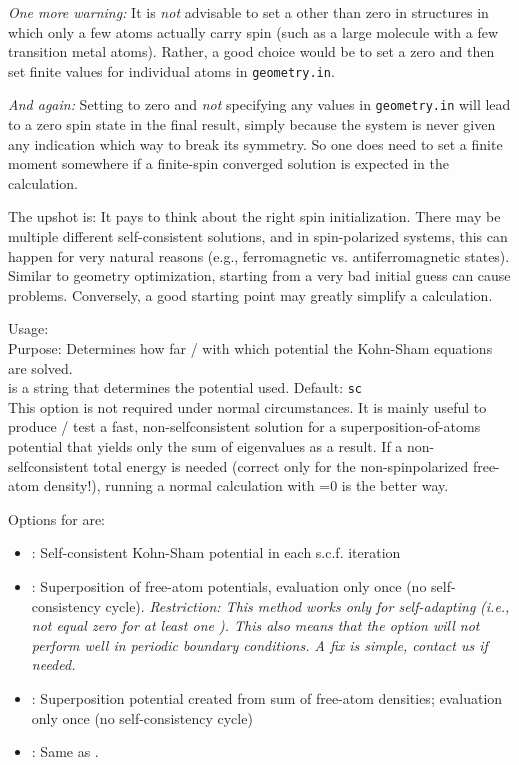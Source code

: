 \emph{One more warning:} It is \emph{not} advisable to set a
 other than zero in structures in
which only a few atoms actually carry spin (such as a large molecule
with a few transition metal atoms). Rather, a good choice would be to
set a zero  and
then set finite  values for individual atoms in
\texttt{geometry.in}. 

\emph{And again:} Setting
 to zero and \emph{not} specifying
any  values in \texttt{geometry.in} will lead
to a zero spin state in the final result, simply because the system is
never given any indication which way to break its symmetry. So one does
need to set a finite moment somewhere if a finite-spin converged
solution is expected in the calculation. 

The upshot is: It pays to think about the right spin
initialization. There may be multiple different  
self-consistent solutions, and in spin-polarized systems, this can
happen for very natural reasons  (e.g., ferromagnetic
vs. antiferromagnetic states). Similar to geometry optimization,
starting from a very bad initial guess can cause
problems. Conversely, a good starting point may greatly simplify a
calculation.  

{
  \noindent
  Usage:   \\[1.0ex]
  Purpose: Determines how far / with which potential the Kohn-Sham
    equations are solved. \\[1.0ex]
   is a string that determines the potential
    used. Default: \texttt{sc} \\
}
This option is not required under normal circumstances. It is mainly
useful to produce / test a fast, non-selfconsistent solution for a
superposition-of-atoms potential that yields only the sum of
eigenvalues as a result. If a non-selfconsistent total energy is
needed (correct only for the non-spinpolarized free-atom density!),
running a normal calculation with =0 is the
better way.  

Options for  are:
\begin{itemize}
  \item {}: Self-consistent Kohn-Sham potential in each
    s.c.f. iteration
  \item {}: Superposition of free-atom potentials,
    evaluation only once (no self-consistency cycle). \emph{Restriction: This
    method works only for self-adapting} 
    \emph{(i.e.,}  \emph{not equal zero for at least one
    ). This also means that the option will not perform well
    in periodic boundary conditions. A fix is simple, contact us if needed.}
  \item {}: Superposition potential created from sum of
    free-atom densities; evaluation only once (no self-consistency cycle)
  \item {}: Same as .
\end{itemize}

